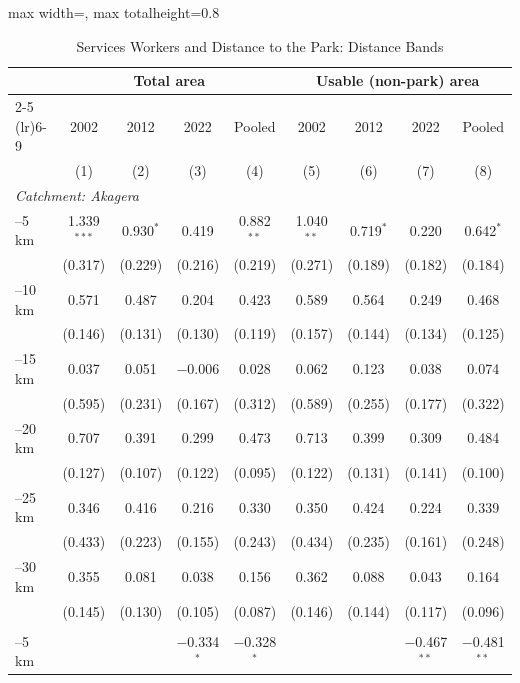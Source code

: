 \documentclass[11pt]{article}
\begin{document}
\begin{table}[H]
\centering\footnotesize\setlength{\tabcolsep}{4pt}
\caption{Services Workers and Distance to the Park: Distance Bands}
\label{tab:dist_bands_services}
\begin{adjustbox}{max width=\textwidth, max totalheight=0.8\textheight}
\begin{tabular}{lcccccccc}
\toprule
 & \multicolumn{4}{c}{Total area} & \multicolumn{4}{c}{Usable (non-park) area} \\
\cmidrule(lr){2-5} \cmidrule(lr){6-9}
 & 2002 & 2012 & 2022 & Pooled & 2002 & 2012 & 2022 & Pooled \\
 & (1) & (2) & (3) & (4) & (5) & (6) & (7) & (8) \\
\midrule
\multicolumn{9}{l}{\textit{Catchment: Akagera}} \\
\quad 0--5 km & 1.339$^{***}$ & 0.930$^{*}$ & 0.419 & 0.882$^{**}$ & 1.040$^{**}$ & 0.719$^{*}$ & 0.220 & 0.642$^{*}$ \\
 & (0.317) & (0.229) & (0.216) & (0.219) & (0.271) & (0.189) & (0.182) & (0.184) \\
\quad 5--10 km & 0.571 & 0.487 & 0.204 & 0.423 & 0.589 & 0.564 & 0.249 & 0.468 \\
 & (0.146) & (0.131) & (0.130) & (0.119) & (0.157) & (0.144) & (0.134) & (0.125) \\
\quad 10--15 km & 0.037 & 0.051 & $-$0.006 & 0.028 & 0.062 & 0.123 & 0.038 & 0.074 \\
 & (0.595) & (0.231) & (0.167) & (0.312) & (0.589) & (0.255) & (0.177) & (0.322) \\
\quad 15--20 km & 0.707 & 0.391 & 0.299 & 0.473 & 0.713 & 0.399 & 0.309 & 0.484 \\
 & (0.127) & (0.107) & (0.122) & (0.095) & (0.122) & (0.131) & (0.141) & (0.100) \\
\quad 20--25 km & 0.346 & 0.416 & 0.216 & 0.330 & 0.350 & 0.424 & 0.224 & 0.339 \\
 & (0.433) & (0.223) & (0.155) & (0.243) & (0.434) & (0.235) & (0.161) & (0.248) \\
\quad 25--30 km & 0.355 & 0.081 & 0.038 & 0.156 & 0.362 & 0.088 & 0.043 & 0.164 \\
 & (0.145) & (0.130) & (0.105) & (0.087) & (0.146) & (0.144) & (0.117) & (0.096) \\
\addlinespace
\multicolumn{9}{l}{\textit{Catchment: Gishwati--Mukura}} \\
\quad 0--5 km &  &  & $-$0.334$^{*}$ & $-$0.328$^{*}$ &  &  & $-$0.467$^{**}$ & $-$0.481$^{**}$ \\

\end{tabular}
\end{adjustbox}
\end{table}
\end{document}
